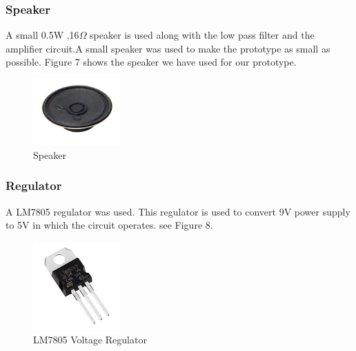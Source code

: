 \documentclass[11pt]{article}
\begin{document}
\subsubsection{Speaker}
A small 0.5W ,16$\Omega$ speaker is used along with the low pass filter and the amplifier circuit.A small speaker was used to make the prototype as small as possible. Figure 7 shows the speaker we have used for our prototype.

\begin{figure}
    \centering
    \includegraphics[width=0.3\textwidth]{Images/speaker.png}
    \caption{Speaker}
\end{figure}

\subsubsection{Regulator}
A LM7805 regulator\cite{7805} was used. This regulator is used to convert 9V power supply to 5V in which the circuit operates. see Figure 8.
\begin{figure}
    \centering
    \includegraphics[width=0.3\textwidth]{Images/7805.jpg}
    \caption{LM7805 Voltage Regulator}
\end{figure}
\end{document}
